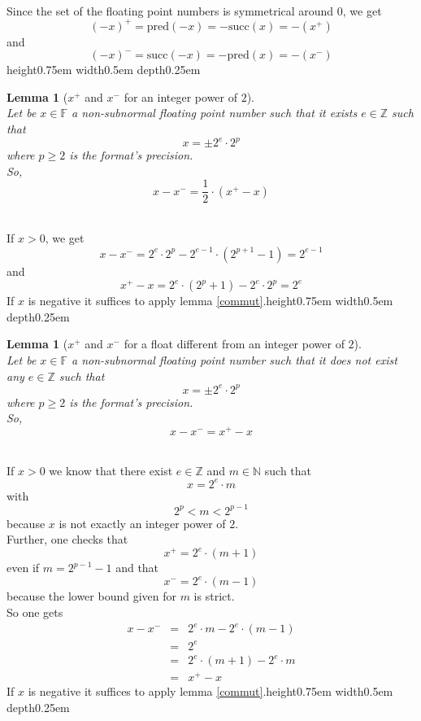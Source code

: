 \documentclass[a4paper,10pt,twoside]{article}
\newtheorem{lemma}[theorem]{Lemma}
\newenvironment{proof}[1][Proof]{\begin{trivlist}
\item[\hskip \labelsep {\bfseries #1}]}{\end{trivlist}}
\newcommand{\qed}{\nobreak \ifvmode \relax \else \ifdim \lastskip<1.5em \hskip-\lastskip
\hskip1.5em plus0em minus0.5em \fi \nobreak \vrule height0.75em width0.5em depth0.25em\fi}
\newcommand{\N}{\ensuremath{\mathbb {N}}}
\newcommand{\Z}{\ensuremath{\mathbb {Z}}}
\newcommand{\F}{\ensuremath{\mathbb {F}}}
\renewcommand{\succ}{\ensuremath{\mathrm{succ}}}
\newcommand{\pred}{\ensuremath{\mathrm{pred}}}
\begin{document}
\begin{proof} ~ \\
Since the set of the floating point numbers is symmetrical around $0$, we get
$$\left( -x\right)^+ = \pred\left( -x \right) = -\succ\left( x \right) = - \left(x^+\right)$$
and
$$\left( -x\right)^- = \succ\left( -x \right) = -\pred\left( x \right) = - \left(x^-\right)$$\qed
\end{proof}
\begin{lemma}[$x^+$ and $x^-$ for an integer power of $2$] \label{poweroftwo} ~ \\
Let be $x \in \F$ a non-subnormal floating point number such that it exists $e \in \Z$ such that
$$x=\pm2^e \cdot 2^p$$
where $p \geq 2$ is the format's precision.\\
So,
$$x - x^-= \frac{1}{2} \cdot \left( x^+ - x \right)$$
\end{lemma}
\begin{proof} ~\\
If $x > 0$, we get
$$x - x^- = 2^e \cdot 2^p - 2^{e-1} \cdot \left( 2^{p+1} - 1 \right) = 2^{e-1}$$
and
$$x^+ - x = 2^e \cdot \left( 2^p + 1 \right) - 2^e \cdot 2^p = 2^e$$
If $x$ is negative it suffices to apply lemma \ref{commut}.\qed
\end{proof}
\begin{lemma}[$x^+$ and $x^-$ for a float different from an integer power of $2$] \label{notpoweroftwo} ~\\
Let be $x \in \F$ a non-subnormal floating point number such that it does not exist any $e \in \Z$
such that $$x=\pm2^e \cdot 2^p$$
where $p \geq 2$ is the format's precision.\\
So,
$$x - x^- = x^+ - x$$
\end{lemma}
\begin{proof} ~ \\
If $x > 0$ we know that there exist $e \in \Z$ and $m \in \N$ such that
$$x = 2^e \cdot m$$
with
$$2^p < m < 2^{p-1}$$
because $x$ is not exactly an integer power of $2$. \\
Further, one checks that
$$x^+ = 2^e \cdot \left( m + 1 \right)$$
even if $m = 2^{p-1} -1$ and that
$$x^- = 2^e \cdot \left( m - 1 \right)$$
because the lower bound given for $m$ is strict. \\
So one gets
\begin{eqnarray*}
x - x^- & = &
2^e \cdot m - 2^e \cdot \left(m - 1 \right) \\
& = & 2^e \\
& = & 2^e \cdot \left( m + 1 \right) - 2^e \cdot m \\
& = & x^+ - x
\end{eqnarray*}
If $x$ is negative it suffices to apply lemma \ref{commut}.\qed
\end{proof}
\end{document}
